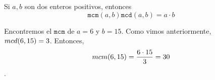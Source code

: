 	\begin{proposicion}
		\label{prop:mcm}
		Si $a,b$ son dos enteros positivos, entonces
		$$
		\texttt{mcm}(a,b)\texttt{mcd}(a,b)= a\cdot b
		$$
	\end{proposicion}

	\begin{problema}
		\label{exmp:mcm}
		Encontremos el $\texttt{mcm}$ de $a=6$ y $b=15.$
		Como vimos anteriormente, $ mcd(6,15)=3 $. Entonces, 
		\[ mcm(6,15)=\dfrac{6\cdot15}{3}= 30 \].
	\end{problema}


